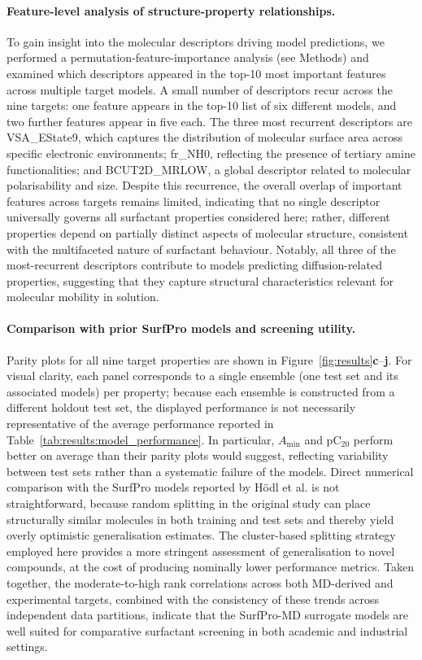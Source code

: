 \documentclass[letterpaper]{article}
\begin{document}
\paragraph{Feature-level analysis of structure-property relationships.}
To gain insight into the molecular descriptors driving model predictions, we performed a permutation-feature-importance analysis (see Methods) and examined which descriptors appeared in the top-10 most important features across multiple target models. A small number of descriptors recur across the nine targets: one feature appears in the top-10 list of six different models, and two further features appear in five each. The three most recurrent descriptors are VSA\_EState9, which captures the distribution of molecular surface area across specific electronic environments; fr\_NH0, reflecting the presence of tertiary amine functionalities; and BCUT2D\_MRLOW, a global descriptor related to molecular polarisability and size. Despite this recurrence, the overall overlap of important features across targets remains limited, indicating that no single descriptor universally governs all surfactant properties considered here; rather, different properties depend on partially distinct aspects of molecular structure, consistent with the multifaceted nature of surfactant behaviour. Notably, all three of the most-recurrent descriptors contribute to models predicting diffusion-related properties, suggesting that they capture structural characteristics relevant for molecular mobility in solution.


\paragraph{Comparison with prior SurfPro models and screening utility.}
Parity plots for all nine target properties are shown in Figure~\ref{fig:results}\textbf{c}--\textbf{j}. For visual clarity, each panel corresponds to a single ensemble (one test set and its associated models) per property; because each ensemble is constructed from a different holdout test set, the displayed performance is not necessarily representative of the average performance reported in Table~\ref{tab:results:model_performance}. In particular, $A_{\min}$ and pC$_{20}$ perform better on average than their parity plots would suggest, reflecting variability between test sets rather than a systematic failure of the models. Direct numerical comparison with the SurfPro models reported by Hödl et al.\cite{hodl_surfpro_2025} is not straightforward, because random splitting in the original study can place structurally similar molecules in both training and test sets and thereby yield overly optimistic generalisation estimates. The cluster-based splitting strategy employed here provides a more stringent assessment of generalisation to novel compounds, at the cost of producing nominally lower performance metrics. Taken together, the moderate-to-high rank correlations across both MD-derived and experimental targets, combined with the consistency of these trends across independent data partitions, indicate that the SurfPro-MD surrogate models are well suited for comparative surfactant screening in both academic and industrial settings.
\end{document}
